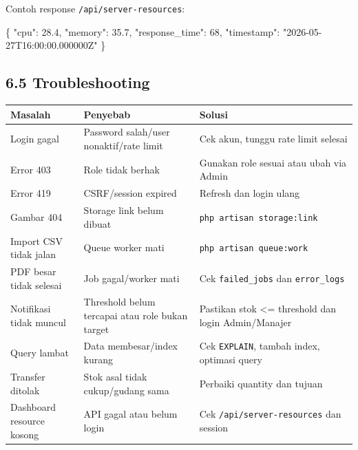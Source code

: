 \documentclass[
]{article}
\newenvironment{Shaded}{}{}
\newcommand{\DataTypeTok}[1]{\textcolor[rgb]{0.56,0.13,0.00}{#1}}
\newcommand{\DecValTok}[1]{\textcolor[rgb]{0.25,0.63,0.44}{#1}}
\newcommand{\FloatTok}[1]{\textcolor[rgb]{0.25,0.63,0.44}{#1}}
\newcommand{\FunctionTok}[1]{\textcolor[rgb]{0.02,0.16,0.49}{#1}}
\newcommand{\StringTok}[1]{\textcolor[rgb]{0.25,0.44,0.63}{#1}}
\begin{document}
Contoh response \texttt{/api/server-resources}:

\begin{Shaded}
\begin{Highlighting}[]
\FunctionTok{\{}
  \DataTypeTok{"cpu"}\FunctionTok{:} \FloatTok{28.4}\FunctionTok{,}
  \DataTypeTok{"memory"}\FunctionTok{:} \FloatTok{35.7}\FunctionTok{,}
  \DataTypeTok{"response\_time"}\FunctionTok{:} \DecValTok{68}\FunctionTok{,}
  \DataTypeTok{"timestamp"}\FunctionTok{:} \StringTok{"2026{-}05{-}27T16:00:00.000000Z"}
\FunctionTok{\}}
\end{Highlighting}
\end{Shaded}

\subsection{6.5 Troubleshooting}\label{65-troubleshooting}

\begin{longtable}[]{@{}P{0.20\textwidth}P{0.26\textwidth}P{0.50\textwidth}@{}}
\toprule\noalign{}
Masalah & Penyebab & Solusi \\
\midrule\noalign{}
\endhead
\bottomrule\noalign{}
\endlastfoot
Login gagal & Password salah/user nonaktif/rate limit & Cek akun, tunggu
rate limit selesai \\
Error 403 & Role tidak berhak & Gunakan role sesuai atau ubah via
Admin \\
Error 419 & CSRF/session expired & Refresh dan login ulang \\
Gambar 404 & Storage link belum dibuat &
\texttt{php\ artisan\ storage:link} \\
Import CSV tidak jalan & Queue worker mati &
\texttt{php\ artisan\ queue:work} \\
PDF besar tidak selesai & Job gagal/worker mati & Cek
\texttt{failed\_jobs} dan \texttt{error\_logs} \\
Notifikasi tidak muncul & Threshold belum tercapai atau role bukan
target & Pastikan stok \textless= threshold dan login Admin/Manajer \\
Query lambat & Data membesar/index kurang & Cek \texttt{EXPLAIN}, tambah
index, optimasi query \\
Transfer ditolak & Stok asal tidak cukup/gudang sama & Perbaiki quantity
dan tujuan \\
Dashboard resource kosong & API gagal atau belum login & Cek
\texttt{/api/server-resources} dan session \\
\end{longtable}
\end{document}
